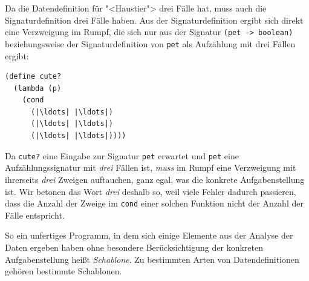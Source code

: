 Da die Datendefinition für "<Haustier"> drei Fälle hat, muss auch die
Signaturdefinition drei Fälle haben.  Aus der Signaturdefinition
ergibt sich direkt eine Verzweigung im Rumpf, die sich nur aus der
Signatur \lstinline{(pet -> boolean)} beziehungsweise der
Signaturdefinition von \lstinline{pet} als Aufzählung mit drei Fällen
ergibt:
%
\begin{lstlisting}
(define cute?
  (lambda (p)
    (cond
      (|\ldots| |\ldots|)
      (|\ldots| |\ldots|)
      (|\ldots| |\ldots|))))
\end{lstlisting}
%
Da \lstinline{cute?} eine Eingabe zur Signatur \lstinline{pet} erwartet und
\lstinline{pet} eine Aufzählungssignatur mit \emph{drei} Fällen ist, \emph{muss}
im Rumpf eine Verzweigung mit ihrerseits \emph{drei} Zweigen
auftauchen, ganz egal, was die konkrete Aufgabenstellung ist.  Wir
betonen das Wort \emph{drei} deshalb so, weil viele Fehler dadurch
passieren, dass die Anzahl der Zweige im \lstinline{cond} einer solchen
Funktion nicht der Anzahl der Fälle entspricht.

So ein unfertiges Programm, in dem sich einige Elemente aus der
Analyse der Daten ergeben haben ohne besondere Berücksichtigung der
konkreten Aufgabenstellung heißt \textit{Schablone}.  Zu bestimmten
Arten von Datendefinitionen gehören bestimmte Schablonen.

